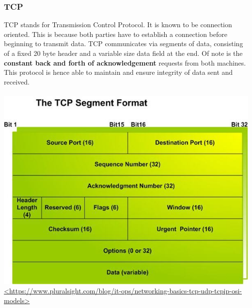 \documentclass{article}
\begin{document}
\subsubsection{TCP}
TCP stands for Transmission Control Protocol. It is known to be connection oriented. This is because both parties have to establish a connection before beginning to transmit data. TCP communicates via segments of data, consisting of a fixed 20 byte header and a variable size data field at the end. Of note is the \textbf{constant back and forth of acknowledgement} requests from both machines. This protocol is hence able to maintain and ensure integrity of data sent and received.\\\\
\includegraphics[width=\textwidth]{TCP.jpg} \\
\url{<https://www.pluralsight.com/blog/it-ops/networking-basics-tcp-udp-tcpip-osi-models>}\\
\end{document}
